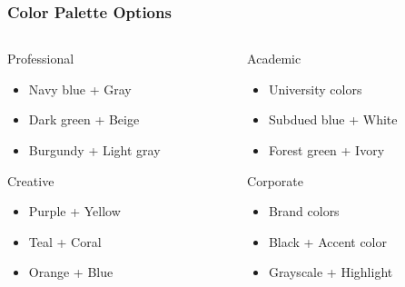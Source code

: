 \documentclass{beamer}
\begin{document}
\begin{frame}
  \frametitle{Color Palette Options}
  
  \begin{columns}
    \begin{column}{0.5\textwidth}
      \begin{block}{Professional}
        \begin{itemize}
          \item Navy blue + Gray
          \item Dark green + Beige
          \item Burgundy + Light gray
        \end{itemize}
      \end{block}
      
      \begin{block}{Creative}
        \begin{itemize}
          \item Purple + Yellow
          \item Teal + Coral
          \item Orange + Blue
        \end{itemize}
      \end{block}
    \end{column}
    
    \begin{column}{0.5\textwidth}
      \begin{block}{Academic}
        \begin{itemize}
          \item University colors
          \item Subdued blue + White
          \item Forest green + Ivory
        \end{itemize}
      \end{block}
      
      \begin{block}{Corporate}
        \begin{itemize}
          \item Brand colors
          \item Black + Accent color
          \item Grayscale + Highlight
        \end{itemize}
      \end{block}
    \end{column}
  \end{columns}
\end{frame}
\end{document}
